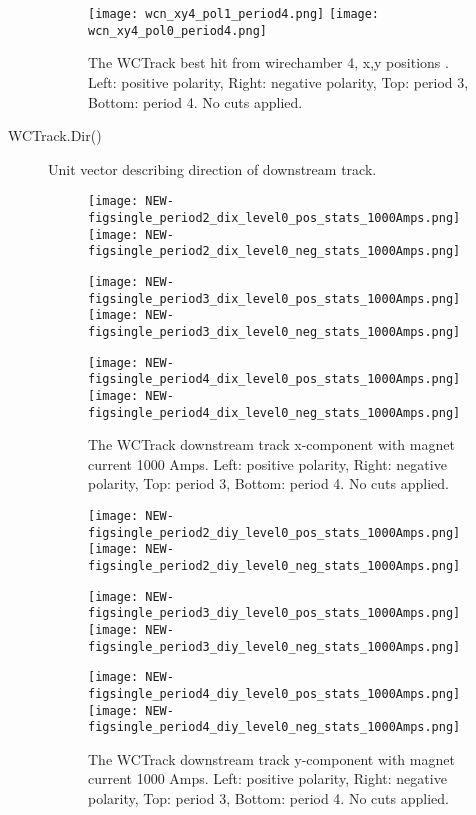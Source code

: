 \begin{description}
{\begin{figure}[h]
	 \texttt{[image: wcn\_xy4\_pol1\_period4.png]}
	 \texttt{[image: wcn\_xy4\_pol0\_period4.png]}
	 
   \caption[short]{The WCTrack  best hit from wirechamber 4,  x,y positions . Left: positive polarity, Right: negative polarity, Top: period 3, Bottom: period 4. No cuts applied.}
   \label{fig_mey}
  \end{figure}
  



}
\item[WCTrack.Dir()]{
Unit vector describing direction of downstream track.

       \begin{figure}[h]	   
         \centering   
        	\texttt{[image: NEW-figsingle\_period2\_dix\_level0\_pos\_stats\_1000Amps.png]}
	 \texttt{[image: NEW-figsingle\_period2\_dix\_level0\_neg\_stats\_1000Amps.png]}
	 
   	\texttt{[image: NEW-figsingle\_period3\_dix\_level0\_pos\_stats\_1000Amps.png]}
	 \texttt{[image: NEW-figsingle\_period3\_dix\_level0\_neg\_stats\_1000Amps.png]}
	 
 	\texttt{[image: NEW-figsingle\_period4\_dix\_level0\_pos\_stats\_1000Amps.png]}
	 \texttt{[image: NEW-figsingle\_period4\_dix\_level0\_neg\_stats\_1000Amps.png]}
   \caption[short]{The WCTrack downstream track x-component with magnet current 1000 Amps. Left: positive polarity, Right: negative polarity, Top: period 3, Bottom: period 4. No cuts applied.}
   \label{fig_dix}
  \end{figure}
  
  
       \begin{figure}[h]	   
         \centering   
        	\texttt{[image: NEW-figsingle\_period2\_diy\_level0\_pos\_stats\_1000Amps.png]}
	 \texttt{[image: NEW-figsingle\_period2\_diy\_level0\_neg\_stats\_1000Amps.png]}
	 
   	\texttt{[image: NEW-figsingle\_period3\_diy\_level0\_pos\_stats\_1000Amps.png]}
	 \texttt{[image: NEW-figsingle\_period3\_diy\_level0\_neg\_stats\_1000Amps.png]}
	 
 	\texttt{[image: NEW-figsingle\_period4\_diy\_level0\_pos\_stats\_1000Amps.png]}
	 \texttt{[image: NEW-figsingle\_period4\_diy\_level0\_neg\_stats\_1000Amps.png]}
   \caption[short]{The WCTrack downstream track y-component with magnet current 1000 Amps. Left: positive polarity, Right: negative polarity, Top: period 3, Bottom: period 4. No cuts applied.}
   \label{fig_diy}
  \end{figure}
  
}
\end{description}
